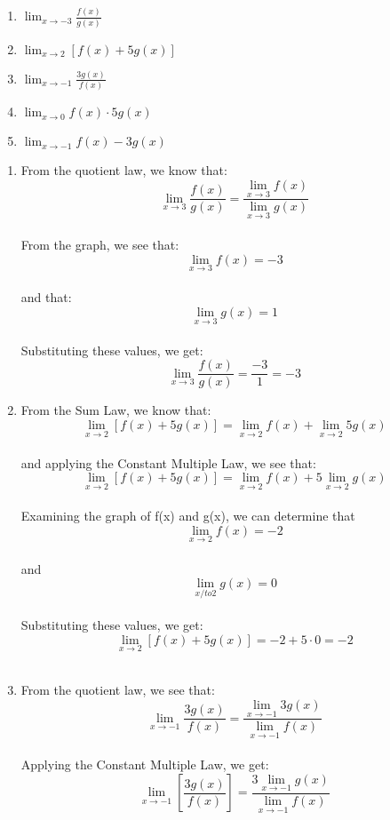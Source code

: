 \begin{Exercise}
    [title = Limits Practice 6, label=limits6]
\begin{enumerate}
    \item $\lim_{x\to-3} \frac{f(x)}{g(x)}$
    \item $\lim_{x\to2}\left[f(x) + 5g(x)\right]$
    \item $\lim_{x\to-1} \frac{3g(x)}{f(x)}$
    \item $\lim_{x\to0}f(x) \cdot 5g(x)$
    \item $\lim_{x\to-1} f(x) - 3g(x) $
\end{enumerate}
\vspace{40mm}
\end{Exercise}
\begin{Answer}
    [ref=limits6]
    \begin{enumerate}
        \item From the quotient law, we know that:
        $$\lim_{x\to3}\frac{f(x)}{g(x)}=\frac{\lim_{x\to3}f(x)}{\lim_{x\to3}g(x)}$$\\
        From the graph, we see that: 
        $$\lim_{x\to3}f(x) = -3$$ \\
        and that:
        $$\lim_{x\to3}g(x) = 1$$ \\
        Substituting these values, we get: 
        $$\lim_{x\to3}\frac{f(x)}{g(x)}=\frac{-3}{1} = -3$$
        \item From the Sum Law, we know that: 
        $$\lim_{x\to2}\left[f(x) + 5g(x)\right]=\lim_{x\to2}f(x) + \lim_{x\to2}5g(x)$$\\
        and applying the Constant Multiple Law, we see that: 
        $$\lim_{x\to2}\left[f(x) + 5g(x)\right]=\lim_{x\to2}f(x) + 5\lim_{x\to2}g(x)$$\\
        Examining the graph of f(x) and g(x), we can determine that 
        $$\lim_{x\to2}f(x) = -2$$ \\
        and 
        $$\lim_{x/to2}g(x) = 0$$\\ 
        Substituting these values, we get: 
        $$\lim_{x\to2}\left[f(x) + 5g(x)\right]=-2 + 5 \cdot 0 = -2$$\\
        \item From the quotient law, we see that: 
        $$\lim_{x\to-1} \frac{3g(x)}{f(x)}=\frac{\lim_{x\to-1}3g(x)}{\lim_{x\to-1}f(x)}$$\\ 
        Applying the Constant Multiple Law, we get: 
        $$\lim_{x\to-1} \left[\frac{3g(x)}{f(x)}\right]=\frac{3\lim_{x\to-1}g(x)}{\lim_{x\to-1}f(x)}$$\\ 

\end{enumerate}
\end{Answer}
